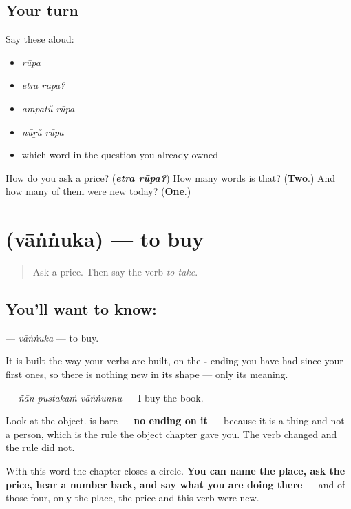\subsection*{Your turn}
Say these aloud:

\begin{itemize}
\raggedright
  \item \emph{rūpa}
  \item \emph{etra rūpa?}
  \item \emph{ampatŭ rūpa}
  \item \emph{nūṟŭ rūpa}
  \item which word in the question you already owned
\end{itemize}

\begin{tcolorbox}[breakable,colback=teal!4,colframe=teal!35!black,title={Before you move on}]
How do you ask a price? (\emph{\textbf{etra rūpa?}}) How many words is that? (\textbf{Two}.) And how many of them were new today? (\textbf{One}.)
\end{tcolorbox}
\section[\texorpdfstring{\ml{വാങ്ങുക} (vāṅṅuka)}{വാങ്ങുക (vāṅṅuka)}]{ (vāṅṅuka) — to buy}

\label{lesson:ML-C91-vaanguka}



\begin{quote}
Ask a price. Then say the verb \emph{to take}.
\end{quote}

\subsection*{You'll want to know: }
\textbf{} — \emph{vāṅṅuka} — to buy.

It is built the way your verbs are built, on the \textbf{-} ending you have had since your first ones, so there is nothing new in its shape — only its meaning.

\textbf{  } — \emph{ñān pustakaṁ vāṅṅunnu} — I buy the book.

Look at the object. \textbf{} is bare — \textbf{no ending on it} — because it is a thing and not a person, which is the rule the object chapter gave you. The verb changed and the rule did not.

With this word the chapter closes a circle. \textbf{You can name the place, ask the price, hear a number back, and say what you are doing there} — and of those four, only the place, the price and this verb were new.

